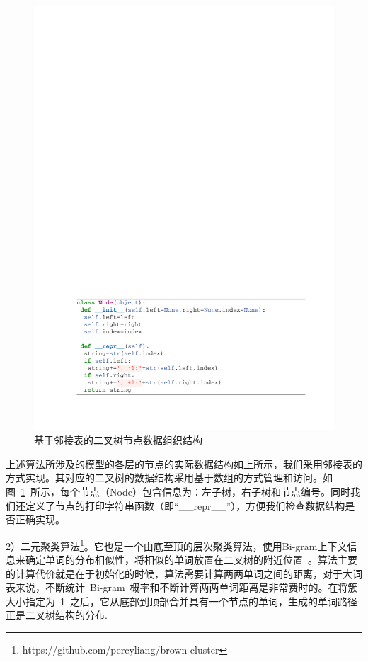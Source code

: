 \begin{figure}[!h]
  \centering
\includegraphics[width=1\linewidth]{./figures/node.pdf}
\caption{基于邻接表的二叉树节点数据组织结构}\label{fig:node}
\end{figure}

上述算法所涉及的模型的各层的节点的实际数据结构如上所示，我们采用邻接表的方式实现。其对应的二叉树的数据结构采用基于数组的方式管理和访问。如图~\ref{fig:node}~所示，每个节点（Node）包含信息为：左子树，右子树和节点编号。同时我们还定义了节点的打印字符串函数（即``\_\_repr\_\_''），方便我们检查数据结构是否正确实现。



2）二元聚类算法\footnote{https://github.com/percyliang/brown-cluster}。它也是一个由底至顶的层次聚类算法，使用Bi-gram上下文信息来确定单词的分布相似性，将相似的单词放置在二叉树的附近位置~。算法主要的计算代价就是在于初始化的时候，算法需要计算两两单词之间的距离，对于大词表来说，不断统计~Bi-gram~概率和不断计算两两单词距离是非常费时的。在将簇大小指定为~1~之后，它从底部到顶部合并具有一个节点的单词，生成的单词路径正是二叉树结构的分布.%


